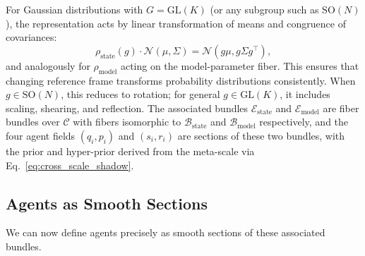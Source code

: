 \documentclass[11pt]{article}
\begin{document}
For Gaussian distributions with $G = \mathrm{GL}(K)$ (or any subgroup such as $\mathrm{SO}(N)$), the representation acts by linear transformation of means and congruence of covariances:
\begin{equation}
\rho_{\mathrm{state}}(g) \cdot \mathcal{N}(\mu, \Sigma) = \mathcal{N}(g\mu, g\Sigma g^\top),
\end{equation}
and analogously for $\rho_{\mathrm{model}}$ acting on the model-parameter fiber. This ensures that changing reference frame transforms probability distributions consistently. When $g \in \mathrm{SO}(N)$, this reduces to rotation; for general $g \in \mathrm{GL}(K)$, it includes scaling, shearing, and reflection. The associated bundles $\mathcal{E}_{\mathrm{state}}$ and $\mathcal{E}_{\mathrm{model}}$ are fiber bundles over $\mathcal{C}$ with fibers isomorphic to $\mathcal{B}_{\mathrm{state}}$ and $\mathcal{B}_{\mathrm{model}}$ respectively, and the four agent fields $(q_i, p_i)$ and $(s_i, r_i)$ are sections of these two bundles, with the prior and hyper-prior derived from the meta-scale via Eq.~\eqref{eq:cross_scale_shadow}.

\subsection{Agents as Smooth Sections}
\label{sec:agent_definition}

We can now define agents precisely as smooth sections of these associated bundles.
\end{document}
